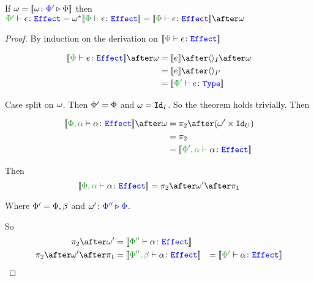 \documentclass{report}
\begin{document}
\begin{theorem}
    If $\w = \deno{\wrelw{\P'}{\P}}$ then $\typerelation{\P'}{\e}{\effect} = \w\star\deno{\typerelation{\P}{\e}{\effect}} = \deno{\typerelation{\P}{\e}{\effect}}\after\w$
    
\end{theorem}

\begin{framed}
    \begin{proof}
        By induction on the derivation on $\deno{\typerelation{\P}{\e}{\effect}}$
        
        \case{\tground}
        \begin{align*}
            \deno{\typerelation{\P}{e}{\effect}}\after\w & = \deno{e}\after\term{I}\after\w \\
            & = \deno{e}\after\term{I'} \\
            & = \deno{\typerelation{\P'}{e}{\type}}\\
        \end{align*}
        
        \case{\evar}
        Case split on $\w$.
        \subcase{$\w = \i$}
        Then $\P' = \P$ and $\w = \Id{I}$. So the theorem holds trivially.
        Then
        
        \begin{align*}
            \deno{\typerelation{\P,\a}{\a}{\effect}}\after\w &= \pp\after(\w'\times \Id{U}) \\
            & = \pp\\
            & = \deno{\typerelation{\P',\a}{\a}{\effect}}
        \end{align*}
        
        Then \begin{equation}
            \deno{\typerelation{\P,\a}{\a}{\effect}} = \pp\after\w'\after\p
        \end{equation}
        
        Where $\P' = \P,\b$ and $\wrel{\w'}{\P''}{\P}$.
        
        So\begin{align*}
            \pp\after\w' & = \deno{\typerelation{\P''}{\a}{\effect}}
            \\
            \pp\after\w'\after\p & =\deno{\typerelation{\P'',\b}{\a}{\effect}}
            &= \deno{\typerelation{\P'}{\a}{\effect}}
        \end{align*}
        

\end{proof}
\end{framed}
\end{document}
